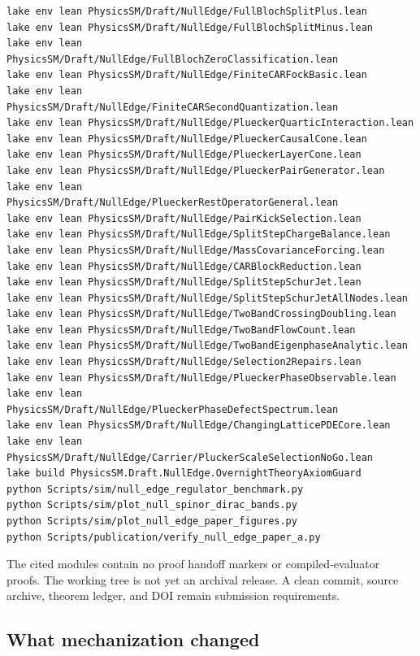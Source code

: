 \documentclass[11pt]{article}
\begin{document}
\begin{verbatim}
lake env lean PhysicsSM/Draft/NullEdge/FullBlochSplitPlus.lean
lake env lean PhysicsSM/Draft/NullEdge/FullBlochSplitMinus.lean
lake env lean PhysicsSM/Draft/NullEdge/FullBlochZeroClassification.lean
lake env lean PhysicsSM/Draft/NullEdge/FiniteCARFockBasic.lean
lake env lean PhysicsSM/Draft/NullEdge/FiniteCARSecondQuantization.lean
lake env lean PhysicsSM/Draft/NullEdge/PlueckerQuarticInteraction.lean
lake env lean PhysicsSM/Draft/NullEdge/PlueckerCausalCone.lean
lake env lean PhysicsSM/Draft/NullEdge/PlueckerLayerCone.lean
lake env lean PhysicsSM/Draft/NullEdge/PlueckerPairGenerator.lean
lake env lean PhysicsSM/Draft/NullEdge/PlueckerRestOperatorGeneral.lean
lake env lean PhysicsSM/Draft/NullEdge/PairKickSelection.lean
lake env lean PhysicsSM/Draft/NullEdge/SplitStepChargeBalance.lean
lake env lean PhysicsSM/Draft/NullEdge/MassCovarianceForcing.lean
lake env lean PhysicsSM/Draft/NullEdge/CARBlockReduction.lean
lake env lean PhysicsSM/Draft/NullEdge/SplitStepSchurJet.lean
lake env lean PhysicsSM/Draft/NullEdge/SplitStepSchurJetAllNodes.lean
lake env lean PhysicsSM/Draft/NullEdge/TwoBandCrossingDoubling.lean
lake env lean PhysicsSM/Draft/NullEdge/TwoBandFlowCount.lean
lake env lean PhysicsSM/Draft/NullEdge/TwoBandEigenphaseAnalytic.lean
lake env lean PhysicsSM/Draft/NullEdge/Selection2Repairs.lean
lake env lean PhysicsSM/Draft/NullEdge/PlueckerPhaseObservable.lean
lake env lean PhysicsSM/Draft/NullEdge/PlueckerPhaseDefectSpectrum.lean
lake env lean PhysicsSM/Draft/NullEdge/ChangingLatticePDECore.lean
lake env lean PhysicsSM/Draft/NullEdge/Carrier/PluckerScaleSelectionNoGo.lean
lake build PhysicsSM.Draft.NullEdge.OvernightTheoryAxiomGuard
python Scripts/sim/null_edge_regulator_benchmark.py
python Scripts/sim/plot_null_spinor_dirac_bands.py
python Scripts/sim/plot_null_edge_paper_figures.py
python Scripts/publication/verify_null_edge_paper_a.py
\end{verbatim}
The cited modules contain no proof handoff markers or compiled-evaluator proofs.
The working tree is not yet an archival release.  A clean commit, source
archive, theorem ledger, and DOI remain submission requirements.

\subsection*{What mechanization changed}
\end{document}
